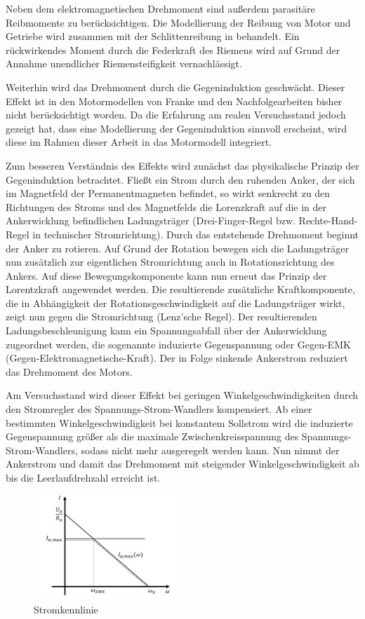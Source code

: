 Neben dem elektromagnetischen Drehmoment sind außerdem parasitäre Reibmomente zu berücksichtigen. Die Modellierung der Reibung von Motor und Getriebe wird zusammen mit der Schlittenreibung in  behandelt. Ein rückwirkendes Moment durch die Federkraft des Riemens wird auf Grund der Annahme unendlicher Riemensteifigkeit vernachlässigt. 

Weiterhin wird das Drehmoment durch die Gegeninduktion geschwächt. Dieser Effekt ist in den Motormodellen von Franke \cite{franke} und den Nachfolgearbeiten bisher nicht berücksichtigt worden. Da die Erfahrung am realen Versuchsstand jedoch gezeigt hat, dass eine Modellierung der Gegeninduktion sinnvoll erscheint, wird diese im Rahmen dieser Arbeit in das Motormodell integriert.

Zum besseren Verständnis des Effekts wird zunächst das physikalische Prinzip der Gegeninduktion betrachtet. Fließt ein Strom durch den ruhenden Anker, der sich im Magnetfeld der Permanentmagneten befindet, so wirkt senkrecht zu den Richtungen des Stroms und des Magnetfelds die Lorenzkraft auf die in der Ankerwicklung befindlichen Ladungsträger (Drei-Finger-Regel bzw. Rechte-Hand-Regel in technischer Stromrichtung). Durch das entstehende Drehmoment beginnt der Anker zu rotieren. Auf Grund der Rotation bewegen sich die Ladungsträger nun zusätzlich zur eigentlichen Stromrichtung auch in Rotationsrichtung des Ankers. Auf diese Bewegungskomponente kann nun erneut das Prinzip der Lorentzkraft angewendet werden. Die resultierende zusätzliche Kraftkomponente, die in Abhängigkeit der Rotationsgeschwindigkeit auf die Ladungsträger wirkt, zeigt nun gegen die Stromrichtung (Lenz'sche Regel). Der resultierenden Ladungsbeschleunigung kann ein Spannungsabfall über der Ankerwicklung zugeordnet werden, die sogenannte induzierte Gegenspannung oder Gegen-EMK (Gegen-Elektromagnetische-Kraft). Der in Folge sinkende Ankerstrom reduziert das Drehmoment des Motors. \cite{binder}

Am Versuchsstand wird dieser Effekt bei geringen Winkelgeschwindigkeiten durch den Stromregler des Spannungs-Strom-Wandlers kompensiert. Ab einer bestimmten Winkelgeschwindigkeit bei konstantem Sollstrom wird die induzierte Gegenspannung größer als die maximale Zwischenkreisspannung des Spannungs-Strom-Wandlers, sodass nicht mehr ausgeregelt werden kann. Nun nimmt der Ankerstrom und damit das Drehmoment mit steigender Winkelgeschwindigkeit ab bis die Leerlaufdrehzahl erreicht ist. 

\begin{figure}[htbp]
	\centering
		\includegraphics[width=0.50\textwidth]{Bilder/Motor/Stromkennlinie.pdf}
	\caption{Stromkennlinie}
	\label{fig:Stromkennlinie}
\end{figure}

